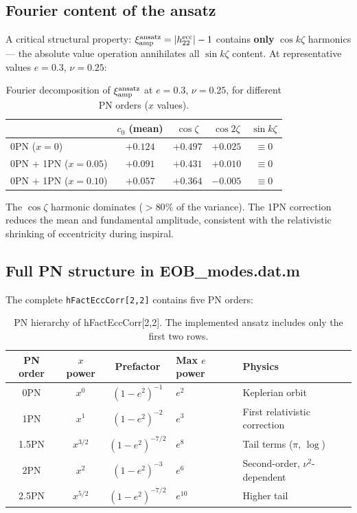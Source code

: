 \documentclass[11pt,letterpaper]{article}
\newcommand{\xamp}{\xi_{\rm amp}}
\begin{document}
\subsection{Fourier content of the ansatz}

A critical structural property: $\xamp^{\rm ansatz} = |h_{22}^{\rm ecc}| - 1$ contains \textbf{only} $\cos k\zeta$ harmonics --- the absolute value operation annihilates all $\sin k\zeta$ content. At representative values $e = 0.3$, $\nu = 0.25$:

\begin{table}[H]
\centering
\caption{Fourier decomposition of $\xamp^{\rm ansatz}$ at $e = 0.3$, $\nu = 0.25$, for different PN orders ($x$ values).}
\label{tab:ansatz_fourier}
\begin{tabular}{@{}lcccc@{}}
\toprule
& $c_0$ (mean) & $\cos\zeta$ & $\cos 2\zeta$ & $\sin k\zeta$ \\
\midrule
0PN ($x = 0$) & $+0.124$ & $+0.497$ & $+0.025$ & $\equiv 0$ \\
0PN + 1PN ($x = 0.05$) & $+0.091$ & $+0.431$ & $+0.010$ & $\equiv 0$ \\
0PN + 1PN ($x = 0.10$) & $+0.057$ & $+0.364$ & $-0.005$ & $\equiv 0$ \\
\bottomrule
\end{tabular}
\end{table}

\noindent The $\cos\zeta$ harmonic dominates ($>80\%$ of the variance). The 1PN correction reduces the mean and fundamental amplitude, consistent with the relativistic shrinking of eccentricity during inspiral.

\subsection{Full PN structure in EOB\_modes.dat.m}

The complete \texttt{hFactEccCorr[2,2]} contains five PN orders:

\begin{table}[H]
\centering
\caption{PN hierarchy of hFactEccCorr[2,2]. The implemented ansatz includes only the first two rows.}
\label{tab:pn_orders}
\begin{tabular}{@{}cccll@{}}
\toprule
PN order & $x$ power & Prefactor & Max $e$ power & Physics \\
\midrule
0PN & $x^0$ & $(1 - e^2)^{-1}$ & $e^2$ & Keplerian orbit \\
1PN & $x^1$ & $(1 - e^2)^{-2}$ & $e^3$ & First relativistic correction \\
\midrule
1.5PN & $x^{3/2}$ & $(1 - e^2)^{-7/2}$ & $e^8$ & Tail terms ($\pi$, $\log$) \\
2PN & $x^2$ & $(1 - e^2)^{-3}$ & $e^6$ & Second-order, $\nu^2$-dependent \\
2.5PN & $x^{5/2}$ & $(1 - e^2)^{-7/2}$ & $e^{10}$ & Higher tail \\
\bottomrule
\end{tabular}
\end{table}
\end{document}
